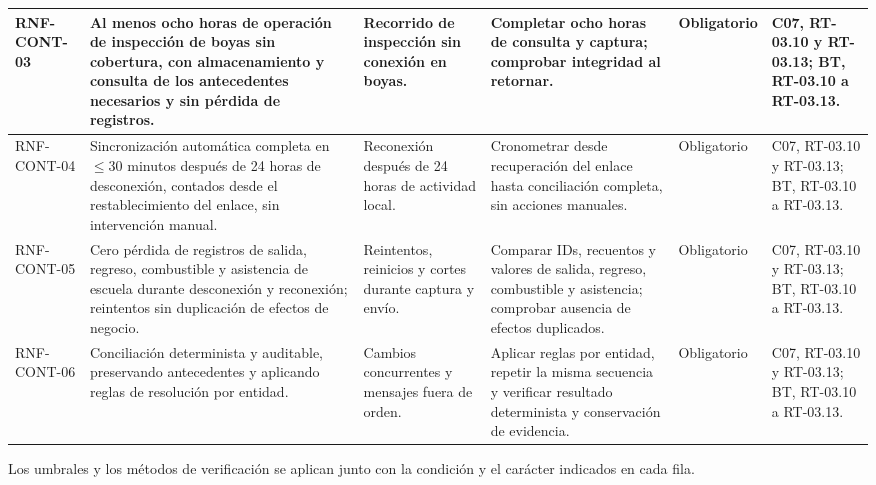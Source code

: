 \begin{longtable}{|L{0.096774\AnchoTablaAnexo}|L{0.298387\AnchoTablaAnexo}|L{0.133065\AnchoTablaAnexo}|L{0.233871\AnchoTablaAnexo}|L{0.076613\AnchoTablaAnexo}|L{0.161290\AnchoTablaAnexo}|}
RNF-CONT-03 &
Al menos ocho horas de operación de inspección de boyas sin cobertura, con almacenamiento y consulta de los antecedentes necesarios y sin pérdida de registros. &
Recorrido de inspección sin conexión en boyas. &
Completar ocho horas de consulta y captura; comprobar integridad al retornar. &
Obligatorio &
C07, RT-03.10 y RT-03.13; BT, RT-03.10 a RT-03.13. \\ \hline
RNF-CONT-04 &
Sincronización automática completa en \(\leq\)30 minutos después de 24 horas de desconexión, contados desde el restablecimiento del enlace, sin intervención manual. &
Reconexión después de 24 horas de actividad local. &
Cronometrar desde recuperación del enlace hasta conciliación completa, sin acciones manuales. &
Obligatorio &
C07, RT-03.10 y RT-03.13; BT, RT-03.10 a RT-03.13. \\ \hline
{}
RNF-CONT-05 &
Cero pérdida de registros de salida, regreso, combustible y asistencia de escuela durante desconexión y reconexión; reintentos sin duplicación de efectos de negocio. &
Reintentos, reinicios y cortes durante captura y envío. &
Comparar IDs, recuentos y valores de salida, regreso, combustible y asistencia; comprobar ausencia de efectos duplicados. &
Obligatorio &
C07, RT-03.10 y RT-03.13; BT, RT-03.10 a RT-03.13. \\ \hline
RNF-CONT-06 &
Conciliación determinista y auditable, preservando antecedentes y aplicando reglas de resolución por entidad. &
Cambios concurrentes y mensajes fuera de orden. &
Aplicar reglas por entidad, repetir la misma secuencia y verificar resultado determinista y conservación de evidencia. &
Obligatorio &
C07, RT-03.10 y RT-03.13; BT, RT-03.10 a RT-03.13. \\ \hline
\end{longtable}

Los umbrales y los métodos de verificación se aplican junto con la condición y el carácter indicados en cada fila.

